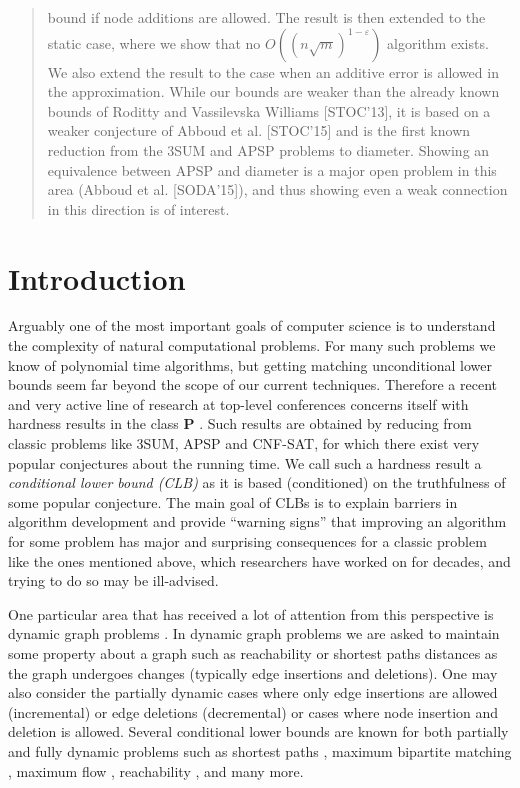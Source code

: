 \documentclass[a4paper,11pt]{article}
\newcommand{\eps}{\varepsilon}
\theoremstyle{definition}
\begin{document}
\begin{abstract}
\begin{itemize}
            bound if node additions are allowed. The result is then extended to
            the static case, where we show that no $O((n\sqrt{m})^{1-\eps})$
            algorithm exists. We also extend the result to the case when an
            additive error is allowed in the approximation. While our bounds
            are weaker than the already known bounds of Roditty and Vassilevska
            Williams [STOC'13], it is based on a weaker conjecture of Abboud et
            al. [STOC'15] and is the first known reduction from the 3SUM
            and APSP problems to diameter.
            Showing an equivalence between APSP and diameter is a major open
            problem in this area (Abboud et al. [SODA'15]), and thus showing
            even a weak connection in this direction is of interest.
    \end{itemize}
\end{abstract}

\section{Introduction}
Arguably one of the most important goals of computer science is to understand
the complexity of natural computational problems. For many such problems we
know of polynomial time algorithms, but getting matching unconditional lower
bounds seem far beyond the scope of our current techniques. Therefore a recent
and very active line of research at top-level conferences concerns itself with
hardness results in the class \textbf{P}
\cite{Patrascu10,AbboudV14,AbboudVY15,HenzingerKNS15,KopelowitzPP16,AbboudGV15,ChechikLRSTW14,AbboudHVW16,CairoGR16,BringmannK15,BackursI15,AbboudBW15,AbboudBW15a}. Such
results are obtained by reducing from classic problems like 3SUM, APSP and
CNF-SAT, for which there exist very popular conjectures about the running time.
We call such a hardness result a \emph{conditional lower bound (CLB)} as it is
based (conditioned) on the truthfulness of some popular conjecture. The main
goal of CLBs is to explain barriers in algorithm development and provide
``warning signs'' that improving an algorithm for some problem has major and
surprising consequences for a classic problem like the ones mentioned above,
which researchers have worked on for decades, and trying to do so may be
ill-advised.

One particular area that has received a lot of attention from this perspective
is dynamic graph problems
\cite{RodittyZ11,Patrascu10,AbboudV14,AbboudVY15,HenzingerKNS15,KopelowitzPP16}.
In dynamic graph problems we are asked to maintain some property about a
graph such as reachability or shortest paths distances as the graph undergoes
changes (typically edge insertions and deletions). One may also consider the
partially dynamic cases where only edge insertions are allowed (incremental) or
edge deletions (decremental) or cases where node insertion and deletion is
allowed. Several conditional lower bounds are known for both partially and
fully dynamic problems such as shortest paths \cite{RodittyZ11,HenzingerKNS15},
maximum bipartite matching \cite{AbboudV14,HenzingerKNS15,KopelowitzPP16},
maximum flow \cite{AbboudVY15}, reachability
\cite{Patrascu10,AbboudV14,HenzingerKNS15}, and many more.
\end{document}
